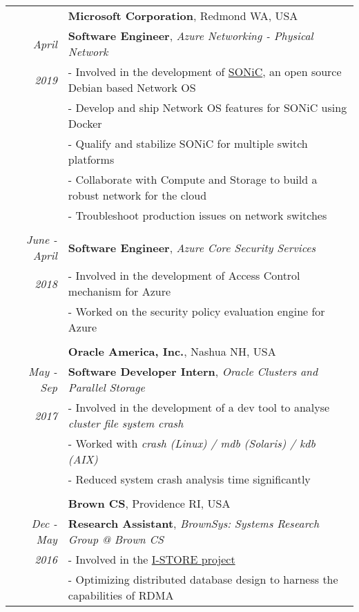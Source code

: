 \documentclass[14pt]{article}
\begin{document}
\begin{tabularx}{\textwidth}{r X}
					& \large\textbf{Microsoft Corporation}, Redmond WA, USA \\
\emph{April} 				& \textbf{Software Engineer}, \emph{Azure Networking - Physical Network} \\
\emph{2019}				& - Involved in the development of \href{https://azure.github.io/SONiC/}{SONiC}, an open source Debian based Network OS \\
					& - Develop and ship Network OS features for SONiC using Docker\\
					& - Qualify and stabilize SONiC for multiple switch platforms \\
					& - Collaborate with Compute and Storage to build a robust network for the cloud \\
					& - Troubleshoot production issues on network switches \\
\\ 
\emph{June - April} 			& \textbf{Software Engineer}, \emph{Azure Core Security Services} \\
\emph{2018 \enskip \enskip 2019} 	& - Involved in the development of Access Control mechanism for Azure \\
					& - Worked on the security policy evaluation engine for Azure \\
\\
					& \large\textbf{Oracle America, Inc.}, Nashua NH, USA \\
\emph{May - Sep} & \textbf{Software Developer Intern}, \emph{Oracle Clusters and Parallel Storage} \\
\emph{2017 \enskip 2017}		& - Involved in the development of a dev tool to analyse \emph{cluster
					 file system crash} \\
					& - Worked with \textit{crash (Linux) / mdb (Solaris) / kdb (AIX)} \\
					& - Reduced system crash analysis time significantly \\
\\ 
					& \large\textbf{Brown CS}, Providence RI, USA \\	
\emph{Dec - May} & \textbf{Research Assistant}, \emph{BrownSys: Systems Research Group @ Brown CS} \\
\emph{2016  \enskip 2018}               & - Involved in the \href{http://binnig.name/?page_id=33}{I-STORE project} \\
					& - Optimizing distributed database design to harness the capabilities of RDMA \\

\end{tabularx}
\end{document}
